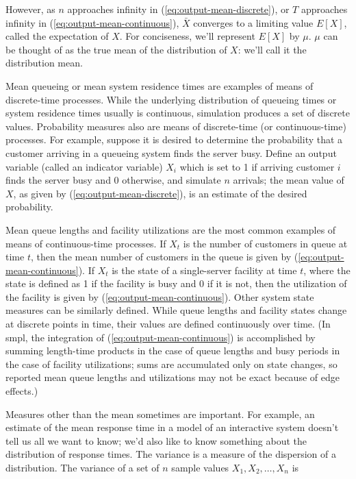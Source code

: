 \noindent However, as $n$ approaches infinity in (\ref{eq:output-mean-discrete}), or $T$
approaches infinity in (\ref{eq:output-mean-continuous}), $\bar{X}$ converges to
a limiting value $E[X]$, called the expectation of $X$. For conciseness, we'll
represent $E[X]$ by $\mu$. $\mu$ can be thought of as the true mean of the
distribution of $X$: we'll call it the distribution mean.

Mean queueing or mean system residence times are examples of means of
discrete-time processes. While the underlying distribution of queueing times
or system residence times usually is continuous, simulation produces a set of
discrete values. Probability measures also are means of discrete-time (or
continuous-time) processes. For example, suppose it is desired to determine
the probability that a customer arriving in a queueing system finds the server
busy. Define an output variable (called an indicator variable) $X_i$ which is
set to 1 if arriving customer $i$ finds the server busy and 0 otherwise, and
simulate $n$ arrivals; the mean value of $X$, as given by
(\ref{eq:output-mean-discrete}), is an estimate of the desired probability.

Mean queue lengths and facility utilizations are the most common examples of
means of continuous-time processes. If $X_t$ is the number of customers in
queue at time $t$, then the mean number of customers in the queue is given by
(\ref{eq:output-mean-continuous}). If $X_t$ is the state of a single-server
facility at time $t$, where the state is defined as 1 if the facility is busy
and 0 if it is not, then the utilization of the facility is given by
(\ref{eq:output-mean-continuous}). Other system state measures can be similarly
defined. While queue lengths and facility states change at discrete points in
time, their values are defined continuously over time. (In smpl, the
integration of (\ref{eq:output-mean-continuous}) is accomplished by summing
length-time products in the case of queue lengths and busy periods in the case
of facility utilizations; sums are accumulated only on state changes, so
reported mean queue lengths and utilizations may not be exact because of edge
effects.)

Measures other than the mean sometimes are important. For example, an estimate
of the mean response time in a model of an interactive system doesn't tell us
all we want to know; we'd also like to know something about the distribution
of response times. The variance is a measure of the dispersion of a
distribution. The variance of a set of $n$ sample values $X_1, X_2, \ldots, X_n$
is

